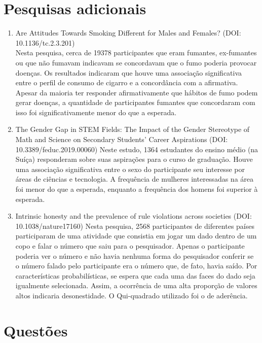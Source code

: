 \documentclass[
]{book}
\begin{document}
\hypertarget{pesquisas-adicionais-1}{%
\section{Pesquisas adicionais}\label{pesquisas-adicionais-1}}

\begin{enumerate}
\def\labelenumi{\arabic{enumi}.}
\item
  Are Attitudes Towards Smoking Different for Males and Females? (DOI: 10.1136/tc.2.3.201)\\
  Nesta pesquisa, cerca de 19378 participantes que eram fumantes, ex-fumantes ou que não fumavam indicavam se concordavam que o fumo poderia provocar doenças. Os resultados indicaram que houve uma associação significativa entre o perfil de consumo de cigarro e a concordância com a afirmativa. Apesar da maioria ter responder afirmativamente que hábitos de fumo podem gerar doenças, a quantidade de participantes fumantes que concordaram com isso foi significativamente menor do que a esperada.
\item
  The Gender Gap in STEM Fields: The Impact of the Gender Stereotype of Math and Science on Secondary Students' Career Aspirations (DOI: 10.3389/feduc.2019.00060)
  Neste estudo, 1364 estudantes do ensino médio (na Suíça) responderam sobre suas aspirações para o curso de graduação. Houve uma associação significativa entre o sexo do participante seu interesse por áreas de ciências e tecnologia. A frequência de mulheres interessadas na área foi menor do que a esperada, enquanto a frequência dos homens foi superior à esperada.
\item
  Intrinsic honesty and the prevalence of rule violations across societies (DOI: 10.1038/nature17160)
  Nesta pesquisa, 2568 participantes de diferentes países participaram de uma atividade que consistia em jogar um dado dentro de um copo e falar o número que saiu para o pesquisador. Apenas o participante poderia ver o número e não havia nenhuma forma do pesquisador conferir se o número falado pelo participante era o número que, de fato, havia saído. Por características probabilísticas, se espera que cada uma das faces do dado seja igualmente selecionada. Assim, a ocorrência de uma alta proporção de valores altos indicaria desonestidade. O Qui-quadrado utilizado foi o de aderência.
\end{enumerate}

\hypertarget{questuxf5es-3}{%
\section{Questões}\label{questuxf5es-3}}
\end{document}
